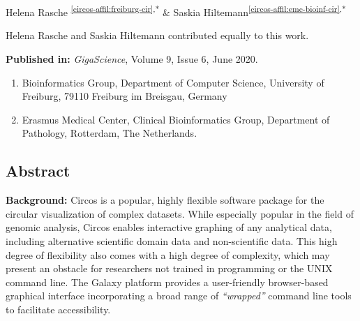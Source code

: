 \cleartorightpage
\setcounter{NAT@ctr}{-1}
\chapter*{}\label{chapter:circos}




Helena Rasche \textsuperscript{\ref{circos-affil:freiburg-cir},*} \&
Saskia Hiltemann\textsuperscript{\ref{circos-affil:emc-bioinf-cir},*}

{\color{chaptergrey}{*}} Helena Rasche and Saskia Hiltemann contributed equally to this work.

\textbf{Published in:} \emph{GigaScience}, Volume 9, Issue 6, June 2020.\\

\small
\begin{enumerate}
 \itemsep-0.5em
 \item Bioinformatics Group, Department of Computer Science, University of Freiburg, 79110 Freiburg im Breisgau, Germany\label{circos-affil:freiburg-cir}
 \item Erasmus Medical Center, Clinical Bioinformatics Group, Department of Pathology, Rotterdam, The Netherlands.\label{circos-affil:emc-bioinf-cir}
\end{enumerate}
\normalsize


\section*{Abstract}

\textbf{Background:}
Circos is a popular, highly flexible software package for the circular visualization of complex datasets. While especially popular in the field of genomic analysis, Circos enables interactive graphing of any analytical data, including alternative scientific domain data and non-scientific data. This high degree of flexibility also comes with a high degree of complexity, which may present an obstacle for researchers not trained in programming or the UNIX command line. The Galaxy platform provides a user-friendly browser-based graphical interface incorporating a broad range of \emph{``wrapped''} command line tools to facilitate accessibility.


